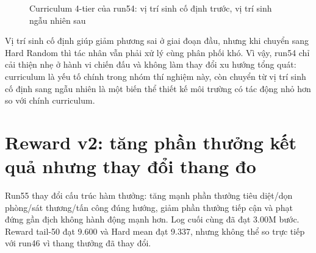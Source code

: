 \begin{figure}[H]
    \centering
    \caption{Curriculum 4-tier của run54: vị trí sinh cố định trước, vị trí sinh ngẫu nhiên sau}
    \label{fig:run54_four_tier}
\end{figure}

Vị trí sinh cố định giúp giảm phương sai ở giai đoạn đầu, nhưng khi chuyển sang Hard Random thì tác nhân vẫn phải xử lý cùng phân phối khó. Vì vậy, run54 chỉ cải thiện nhẹ ở hành vi chiến đấu và không làm thay đổi xu hướng tổng quát: curriculum là yếu tố chính trong nhóm thí nghiệm này, còn chuyển từ vị trí sinh cố định sang ngẫu nhiên là một biến thể thiết kế môi trường có tác động nhỏ hơn so với chính curriculum.

\section{Reward v2: tăng phần thưởng kết quả nhưng thay đổi thang đo}

Run55 thay đổi cấu trúc hàm thưởng: tăng mạnh phần thưởng tiêu diệt/dọn phòng/sát thương/tấn công đúng hướng, giảm phần thưởng tiếp cận và phạt đứng gần địch không hành động mạnh hơn. Log cuối cùng đã đạt 3.00M bước. Reward tail-50 đạt 9.600 và Hard mean đạt 9.337, nhưng không thể so trực tiếp với run46 vì thang thưởng đã thay đổi.

